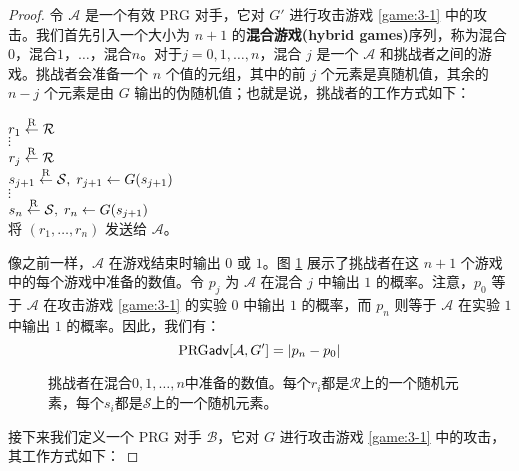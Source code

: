 \begin{proof}
令 $\mathcal A$ 是一个有效 PRG 对手，它对 $G'$ 进行攻击游戏 \ref{game:3-1} 中的攻击。我们首先引入一个大小为 $n+1$ 的\textbf{混合游戏(hybrid games)}序列，称为混合$0$，混合$1$，$\dots$，混合$n$。对于$j=0,1,\dots,n$，混合 $j$ 是一个 $\mathcal A$ 和挑战者之间的游戏。挑战者会准备一个 $n$ 个值的元组，其中的前 $j$ 个元素是真随机值，其余的 $n-j$ 个元素是由 $G$ 输出的伪随机值；也就是说，挑战者的工作方式如下：

\vspace*{5pt}

\hspace*{5pt} $r_1\overset{\rm R}\leftarrow\mathcal R$\\
\hspace*{50pt} $\vdots$\\
\hspace*{26pt} $r_j\overset{\rm R}\leftarrow\mathcal R$\\
\hspace*{26pt} $s_{j+1}\overset{\rm R}\leftarrow\mathcal{S},\;r_{j+1}\leftarrow G(s_{j+1})$\\
\hspace*{50pt} $\vdots$\\
\hspace*{26pt} $s_{n}\overset{\rm R}\leftarrow\mathcal{S},\;r_{n}\leftarrow G(s_{j+1})$\\
\hspace*{26pt} 将 $(r_1,\dots,r_n)$ 发送给 $\mathcal A$。

\vspace*{5pt}

\noindent
像之前一样，$\mathcal A$ 在游戏结束时输出 $0$ 或 $1$。图 \ref{fig:3-5} 展示了挑战者在这 $n+1$ 个游戏中的每个游戏中准备的数值。令 $p_j$ 为 $\mathcal A$ 在混合 $j$ 中输出 $1$ 的概率。注意，$p_0$ 等于 $\mathcal A$ 在攻击游戏 \ref{game:3-1} 的实验 $0$ 中输出 $1$ 的概率，而 $p_n$ 则等于 $\mathcal A$ 在实验 $1$ 中输出 $1$ 的概率。因此，我们有：
\begin{equation}\label{eq:3-9}
{\rm PRG\mathsf{adv}}[\mathcal{A},G']=|p_n-p_0|
\end{equation}

\begin{figure}
	\centering
	
	\caption{挑战者在混合$0,1,\dots,n$中准备的数值。每个$r_i$都是$\mathcal{R}$上的一个随机元素，每个$s_i$都是$\mathcal{S}$上的一个随机元素。}
	\label{fig:3-5}
\end{figure}

接下来我们定义一个 PRG 对手 $\mathcal B$，它对 $G$ 进行攻击游戏 \ref{game:3-1} 中的攻击，其工作方式如下：


\end{proof}

